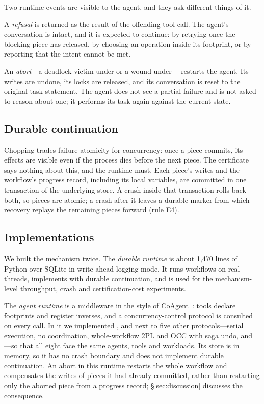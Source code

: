 Two runtime events are visible to the agent, and they ask different things of
it.

A \emph{refusal} is returned as the result of the offending tool call. The
agent's conversation is intact, and it is expected to continue: by retrying
once the blocking piece has released, by choosing an operation inside its
footprint, or by reporting that the intent cannot be met.

An \emph{abort}---a deadlock victim under \cctwo or a wound under
\ccs---restarts the agent. Its writes are undone, its locks are released, and
its conversation is reset to the original task statement. The agent does not
see a partial failure and is not asked to reason about one; it performs its
task again against the current state.

\subsection{Durable continuation}

Chopping trades failure atomicity for concurrency: once a piece commits, its
effects are visible even if the process dies before the next piece. The
certificate says nothing about this, and the runtime must. Each piece's writes
and the workflow's progress record, including its local variables, are
committed in one transaction of the underlying store. A crash inside that
transaction rolls back both, so pieces are atomic; a crash after it leaves a
durable marker from which recovery replays the remaining pieces forward (rule
E4).

\subsection{Implementations}
\label{sec:runtime:impl}

We built the mechanism twice. The \emph{durable runtime} is about 1{,}470
lines of Python over SQLite in write-ahead-logging mode. It runs workflows on
real threads, implements \cc with durable continuation, and is used for the
mechanism-level throughput, crash and certification-cost experiments.

The \emph{agent runtime} is a middleware in the style of
CoAgent~\cite{lyu2026coagent}: tools declare footprints and register
inverses, and a concurrency-control protocol is consulted on every call. In
it we implemented \cc, \cctwo and \ccs next to five other protocols---serial
execution, no coordination, whole-workflow 2PL and OCC with saga undo, and
\mtpo---so that all eight face the same agents, tools and workloads. Its
store is in memory, so it has no crash boundary and does not implement durable
continuation. An abort in this runtime restarts the whole workflow and
compensates the writes of pieces it had already committed, rather than
restarting only the aborted piece from a progress record; \S\ref{sec:discussion}
discusses the consequence.
